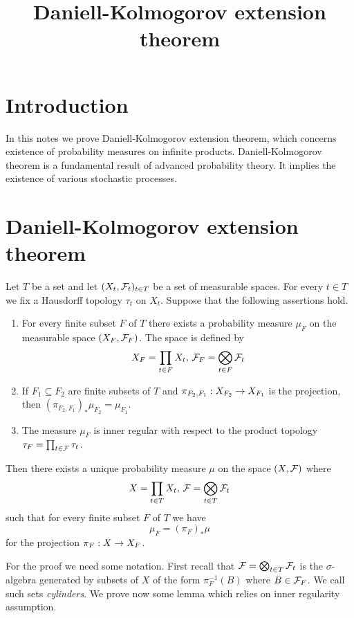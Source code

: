 



\title{Daniell-Kolmogorov extension theorem}
\date{}
\maketitle

\section{Introduction}
\noindent
In this notes we prove Daniell-Kolmogorov extension theorem, which concerns existence of probability measures on infinite products. Daniell-Kolmogorov theorem is a fundamental result of advanced probability theory. It implies the existence of various stochastic processes.

\section{Daniell-Kolmogorov extension theorem}

\begin{theorem}\label{theorem:Daniell_Kolmogorov_extension}
Let $T$ be a set and let $(X_t,{\mathcal F}_t)_{t\in T}$ be a set of measurable spaces. For every $t\in T$ we fix a Hausdorff topology $\tau_t$ on $X_t$. Suppose that the following assertions hold.
\begin{enumerate}[label=\emph{\textbf{(\arabic*)}}, leftmargin=*]
\item For every finite subset $F$ of $T$ there exists a probability measure $\mu_F$ on the measurable space $(X_F,{\mathcal F}_F)$. The space is defined by
$$X_F = \prod_{t\in F}X_t,\,{\mathcal F}_F = \bigotimes_{t\in F}{\mathcal F}_t$$
\item If $F_1\subseteq F_2$ are finite subsets of $T$ and $\pi_{F_2,F_1}:X_{F_2}\rightarrow X_{F_1}$ is the projection, then $\left(\pi_{F_2,F_1}\right)_*\mu_{F_2} = \mu_{F_1}$.
\item The measure $\mu_F$ is inner regular with respect to the product topology $\tau_F = \prod_{t\in {\mathcal F}}\tau_t$.
\end{enumerate}
Then there exists a unique probability measure $\mu$ on the space $(X,{\mathcal F})$ where 
$$X = \prod_{t\in T}X_t,\,{\mathcal F} = \bigotimes_{t\in T}{\mathcal F}_t$$
such that for every finite subset $F$ of $T$ we have
$$\mu_F = \left(\pi_F\right)_*\mu$$
for the projection $\pi_F:X\rightarrow X_F$.
\end{theorem}
\noindent
For the proof we need some notation. First recall that ${\mathcal F} = \bigotimes_{t\in T}{\mathcal F}_t$ is the $\sigma$-algebra generated by subsets of $X$ of the form $\pi_F^{-1}(B)$ where $B\in {\mathcal F}_F$. We call such sets \textit{cylinders}. We prove now some lemma which relies on inner regularity assumption.


